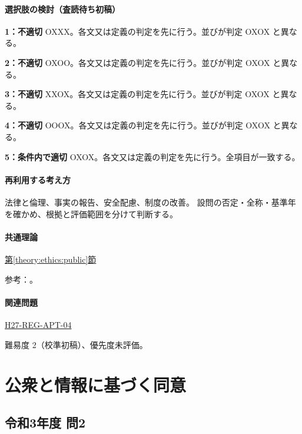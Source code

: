 \paragraph{選択肢の検討（査読待ち初稿）}\mbox{}\par

\noindent\textbf{1：不適切} OXXX。各文又は定義の判定を先に行う。並びが判定 OXOX と異なる。\par

\noindent\textbf{2：不適切} OXOO。各文又は定義の判定を先に行う。並びが判定 OXOX と異なる。\par

\noindent\textbf{3：不適切} XXOX。各文又は定義の判定を先に行う。並びが判定 OXOX と異なる。\par

\noindent\textbf{4：不適切} OOOX。各文又は定義の判定を先に行う。並びが判定 OXOX と異なる。\par

\noindent\textbf{5：条件内で適切} OXOX。各文又は定義の判定を先に行う。全項目が一致する。\par

\paragraph{再利用する考え方} 法律と倫理、事実の報告、安全配慮、制度の改善。 設問の否定・全称・基準年を確かめ、根拠と評価範囲を分けて判断する。

\paragraph{共通理論} \hyperref[theory:ethics:public]{第\ref*{theory:ethics:public}節}

\par 参考：\cite{ipej_ethics2011}。

\paragraph{関連問題} \hyperref[q:h27-reg-apt-04]{H27-REG-APT-04}

\par 難易度 2（校準初稿）、優先度未評価。

\section{公衆と情報に基づく同意}

\subsection{令和3年度 問2}
\label{q:r03-reg-apt-02}

